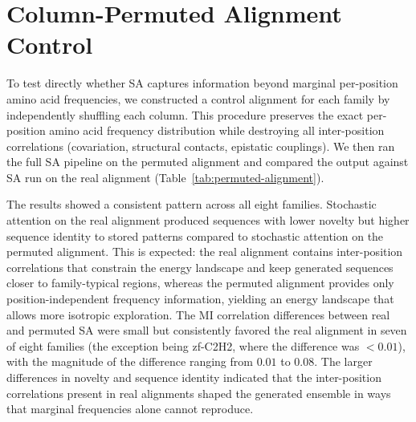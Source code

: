 \documentclass[10pt]{article}
\begin{document}
\section{Column-Permuted Alignment Control}\label{si:permuted-alignment}

To test directly whether SA captures information beyond marginal per-position amino acid frequencies, we constructed a control alignment for each family by independently shuffling each column. This procedure preserves the exact per-position amino acid frequency distribution while destroying all inter-position correlations (covariation, structural contacts, epistatic couplings). We then ran the full SA pipeline on the permuted alignment and compared the output against SA run on the real alignment (Table~\ref{tab:permuted-alignment}).

The results showed a consistent pattern across all eight families. Stochastic attention on the real alignment produced sequences with lower novelty but higher sequence identity to stored patterns compared to stochastic attention on the permuted alignment. This is expected: the real alignment contains inter-position correlations that constrain the energy landscape and keep generated sequences closer to family-typical regions, whereas the permuted alignment provides only position-independent frequency information, yielding an energy landscape that allows more isotropic exploration. The MI correlation differences between real and permuted SA were small but consistently favored the real alignment in seven of eight families (the exception being zf-C2H2, where the difference was $<0.01$), with the magnitude of the difference ranging from $0.01$ to $0.08$. The larger differences in novelty and sequence identity indicated that the inter-position correlations present in real alignments shaped the generated ensemble in ways that marginal frequencies alone cannot reproduce.
\end{document}
